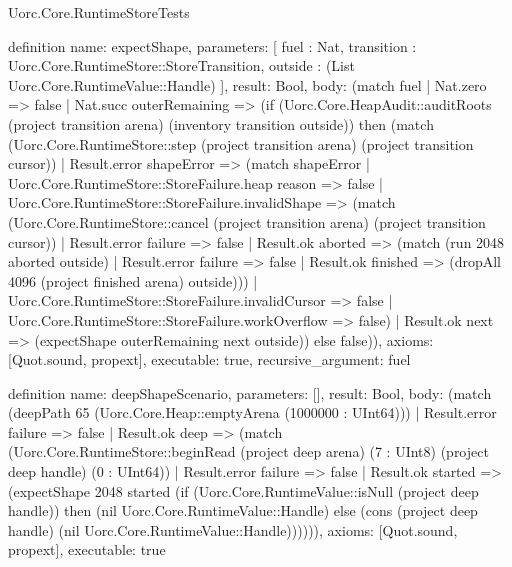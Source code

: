\begin{lexlean}{Uorc.Core.RuntimeStoreTests}
\begin{semanticmodule}
definition{
  name: expectShape,
  parameters: [
    fuel : Nat,
    transition : Uorc.Core.RuntimeStore::StoreTransition,
    outside : (List Uorc.Core.RuntimeValue::Handle)
  ],
  result: Bool,
  body: (match fuel
    | Nat.zero => false
    | Nat.succ outerRemaining => (if (Uorc.Core.HeapAudit::auditRoots (project transition arena) (inventory transition outside)) then (match (Uorc.Core.RuntimeStore::step (project transition arena) (project transition cursor))
      | Result.error shapeError => (match shapeError
        | Uorc.Core.RuntimeStore::StoreFailure.heap reason => false
        | Uorc.Core.RuntimeStore::StoreFailure.invalidShape => (match (Uorc.Core.RuntimeStore::cancel (project transition arena) (project transition cursor))
          | Result.error failure => false
          | Result.ok aborted => (match (run 2048 aborted outside)
            | Result.error failure => false
            | Result.ok finished => (dropAll 4096 (project finished arena) outside)))
        | Uorc.Core.RuntimeStore::StoreFailure.invalidCursor => false
        | Uorc.Core.RuntimeStore::StoreFailure.workOverflow => false)
      | Result.ok next => (expectShape outerRemaining next outside)) else false)),
  axioms: [Quot.sound, propext],
  executable: true,
  recursive_argument: fuel
}

definition{
  name: deepShapeScenario,
  parameters: [],
  result: Bool,
  body: (match (deepPath 65 (Uorc.Core.Heap::emptyArena (1000000 : UInt64)))
    | Result.error failure => false
    | Result.ok deep => (match (Uorc.Core.RuntimeStore::beginRead (project deep arena) (7 : UInt8) (project deep handle) (0 : UInt64))
      | Result.error failure => false
      | Result.ok started => (expectShape 2048 started (if (Uorc.Core.RuntimeValue::isNull (project deep handle)) then (nil Uorc.Core.RuntimeValue::Handle) else (cons (project deep handle) (nil Uorc.Core.RuntimeValue::Handle)))))),
  axioms: [Quot.sound, propext],
  executable: true
}


\end{semanticmodule}
\end{lexlean}
